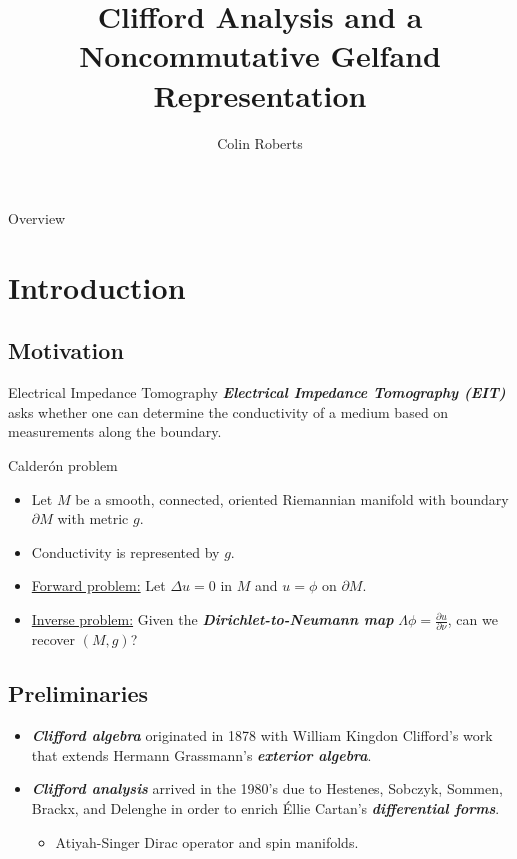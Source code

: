 \documentclass[aspectratio=169,handout]{beamer}
\author{Colin Roberts}
\title{Clifford Analysis and a Noncommutative Gelfand Representation}
\subtitle{}
\newcommand\boldgreen[1]{\textcolor{lighter_csu_green}{\emph{\textbf{#1}}}}
\begin{document}
\begin{frame}{Overview}
\tableofcontents
\end{frame}

\section{Introduction}

\subsection{Motivation}
\begin{frame}{Electrical Impedance Tomography}
\vfill
\boldgreen{Electrical Impedance Tomography (EIT)} asks whether one can determine the conductivity of a medium based on measurements along the boundary.
\vfill
\end{frame}

\begin{frame}{Calder\'on problem}
\vfill 
    \begin{itemize}
        \pause 
        \item Let $M$ be a smooth, connected, oriented Riemannian manifold with boundary $\partial M$ with metric $g$.
        
        \pause
        \item Conductivity is represented by $g$.
        
        \pause
        \item \underline{Forward problem:} Let $\Delta u = 0$ in $M$ and $u=\phi$ on $\partial M$.
        
        \pause
        \item \underline{Inverse problem:} Given the \boldgreen{Dirichlet-to-Neumann map} $\Lambda \phi = \frac{\partial u}{\partial \nu}$, can we recover $(M,g)$?
    \end{itemize}
\vfill
\end{frame}

\subsection{Preliminaries}


\begin{frame}{}
\vfill
\begin{itemize}
    \item \boldgreen{Clifford algebra} originated in 1878 with William Kingdon Clifford's work that extends Hermann Grassmann's \boldgreen{exterior algebra}.
    \pause
    \item \boldgreen{Clifford analysis} arrived in the 1980's due to Hestenes, Sobczyk, Sommen, Brackx, and Delenghe in order to enrich \'Ellie Cartan's \boldgreen{differential forms}.
    \begin{itemize}
    \pause
        \item Atiyah-Singer Dirac operator and spin manifolds.
    \end{itemize}
\end{itemize}
\vfill
\end{frame}
\end{document}
